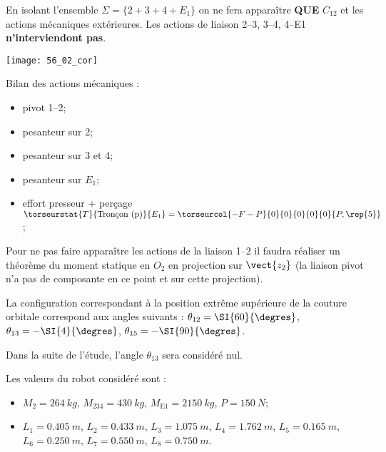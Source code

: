 \ifprof
En isolant l'ensemble $\Sigma = \{2+3+4+E_1\}$ on ne fera apparaître \textbf{QUE} $C_{12}$ et les actions mécaniques extérieures. Les actions de liaison 2--3, 3--4, 4--E1 \textbf{n'interviendont pas}. 
\else
\fi

\ifprof
\begin{center}
\texttt{[image: 56\_02\_cor]}
\end{center}
Bilan des actions mécaniques :
\begin{itemize}
\item pivot 1--2;
\item pesanteur sur 2;
\item pesanteur sur 3 et 4;
\item pesanteur sur $E_1$;
\item effort presseur + perçage $\torseurstat{T}{\text{Tronçon (p)}}{E_1}=\torseurcol{-F-P}{0}{0}{0}{0}{0}{P, \rep{5}}$;

\end{itemize}
\else
\fi

\ifprof
Pour ne pas faire apparaître les actions de la liaison 1--2 il faudra réaliser un théorème du moment statique en $O_2$ en projection sur $\vect{z_2}$ (la liaison pivot n'a pas de composante en ce point et sur cette projection).
\else
\fi


La configuration correspondant à la position extrême supérieure de la couture orbitale correspond aux angles suivants : $\theta_{12}=\SI{60}{\degres}$, $\theta_{13}=-\SI{4}{\degres}$, $\theta_{15}=-\SI{90}{\degres}$.

Dans la suite de l'étude, l'angle $\theta_{13}$ sera considéré nul.

\ifprof
\else
\fi

Les valeurs du robot considéré sont :
\begin{itemize}
\item $M_{2}=\SI{264}{kg}$, $M_{234}=\SI{430}{kg}$, $M_{\text{E1}}=\SI{2150}{kg}$, $P=\SI{150}{N}$;
\item $L_{1}=\SI{0,405}{m}$, $L_{2}=\SI{0,433}{m}$, $L_{3}=\SI{1,075}{m}$, $L_{4}=\SI{1,762}{m}$, $L_{5}=\SI{0,165}{m}$, $L_{6}=\SI{0,250}{m}$, $L_{7}=\SI{0,550}{m}$, $L_{8}=\SI{0,750}{m}$.
\end{itemize}

